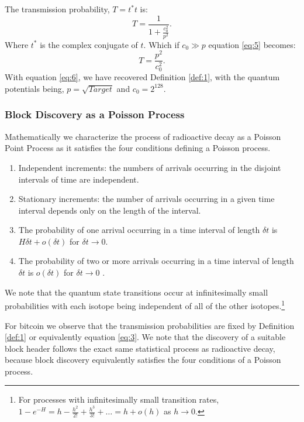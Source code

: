 \documentclass[runningheads]{llncs}
\begin{document}
The transmission probability, $T = t^*t$ is:
\begin{equation}
    T = \frac{1}{1+\frac{c_0^2}{p^2}}. \label{eq:5}
\end{equation}
Where $t^*$ is the complex conjugate of $t$.
Which if $c_0 \gg p$ equation \ref{eq:5} becomes:
\begin{equation}
    T = \frac{p^2}{c_0^2}. \label{eq:6}
\end{equation}
With equation \ref{eq:6}, we have recovered Definition \ref{def:1}, with the quantum potentials being, $p = \sqrt{Target}$ and $c_0 = 2^{128}$.

\subsubsection{Block Discovery as a Poisson Process}
Mathematically we characterize the process of radioactive decay as a Poisson Point Process as it satisfies the four conditions defining a Poisson process.
\begin{enumerate}
    \item Independent increments: the numbers of arrivals occurring in the disjoint intervals of time are independent.
    \item Stationary increments: the number of arrivals occurring in a given time interval depends only on the length of the interval.
    \item The probability of one arrival occurring in a time interval of length $\delta t$ is $H \delta t + o(\delta t)$ for $\delta t \rightarrow 0$.
    \item The probability of two or more arrivals occurring in a time interval of length $\delta t$ is $o(\delta t)$ for $\delta t \rightarrow 0$ \cite{tijms2003first}.
          
\end{enumerate}
We note that the quantum state transitions occur at infinitesimally small probabilities with each isotope being independent of all of the other isotopes.\footnote{
    For processes with infinitesimally small transition rates, $1 - e^{-H} = h - \frac{h^2}{2!} + \frac{h^3}{3!} + \ldots = h + o(h)$ as $h \rightarrow 0$\cite{tijms2003first}.}

For bitcoin we observe that the transmission probabilities are fixed by Definition \ref{def:1} or equivalently equation \ref{eq:3}.
We note that the discovery of a suitable block header follows the exact same statistical process as radioactive decay, because block discovery equivalently satisfies the four conditions of a Poisson process.
\end{document}
